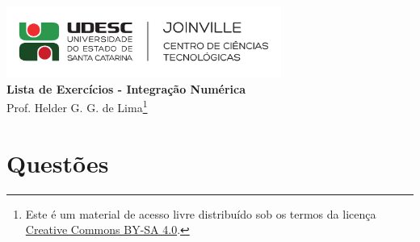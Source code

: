 \documentclass[12pt,a4paper]{article}
\author{\eu}
\title{\tipo}
\date{\data}
\newcommand{\IconPc}{\texttt{[image: computer.png]}}
\newcommand{\IconCalc}{\texttt{[image: calculator.png]}}
\newcommand{\IconThink}{\texttt{[image: pencil.png]}}
\newcommand{\IconCheck}{\texttt{[image: checkmark.png]}}
\newlength{\SmileysLength}
\newcommand{\calc}{\hspace*{-\SmileysLength}\makebox[0pt][r]{\IconCalc}%
   \hspace*{\SmileysLength}}
\newcommand{\software}{\hspace*{-\SmileysLength}\makebox[0pt][r]{\IconPc}%
   \hspace*{\SmileysLength}}
\newcommand{\teoria}{\hspace*{-\SmileysLength}\makebox[0pt][r]{\IconThink}%
   \hspace*{\SmileysLength}}
\newcommand{\conceito}{\hspace*{-\SmileysLength}\makebox[0pt][r]{\IconCheck}%
   \hspace*{\SmileysLength}}
\newcommand*\tipo{Lista de Exercícios - Integração Numérica}
\newcommand*\eu{Helder G. G. de Lima}
\begin{document}
\begin{center}
\includegraphics[width=9.0cm]{marca} \\
\textbf{\tipo} \\
Prof. \eu\footnote{
Este é um material de acesso livre distribuído sob os termos da licença \href{https://creativecommons.org/licenses/by-sa/4.0/deed.pt_BR}{Creative Commons BY-SA 4.0}.}
\end{center}


\section*{Questões}
\end{document}
